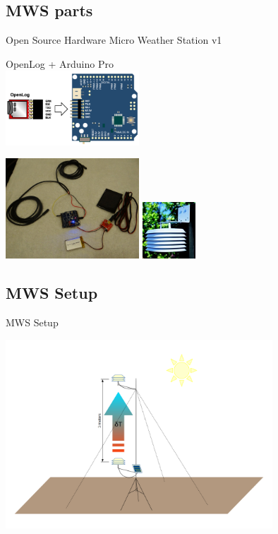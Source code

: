\documentclass[xcolor=dvipsnames,beamer]{beamer} %
\begin{document}
\subsection{MWS parts}
\begin{frame}[fragile]{Open Source Hardware Micro Weather Station v1}

\begin{center}
OpenLog + Arduino Pro\\
\vspace{5mm}
\includegraphics[width=5cm]{Arduino_OpenLog}
\end{center}

\begin{flushright}
  \includegraphics[width=5cm]{MWS}
  \hspace{5mm}
  \includegraphics[width=2cm]{MWS_radshield}
\end{flushright}
\end{frame}

\subsection{MWS Setup}
\begin{frame}[fragile]{MWS Setup}

\begin{center}
 \includegraphics[width=10cm]{MWS_v1_deltaT_sketch_hot}
\end{center}

\end{frame}
\end{document}
